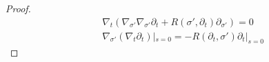 \documentclass[pdflatex,sn-mathphys-num]{sn-jnl}
\newcommand{\Junbang}[1]{{\color{magenta}#1}}
\theoremstyle{definition}
\begin{document}
\begin{proof}
\begin{align}
    &\nabla_{t}(\nabla_{\sigma'}\nabla_{\sigma'}\partial_{t} + R(\sigma',\partial_{t})\partial_{\sigma'}) = 0\label{eqn:time-time}\\
    &\nabla_{\sigma'}(\nabla_{t}\partial_{t})|_{s = 0} = - R(\partial_{t},\sigma')\partial_{t}|_{s = 0}\label{ini:time-time}
\end{align}


\end{proof}
\end{document}

